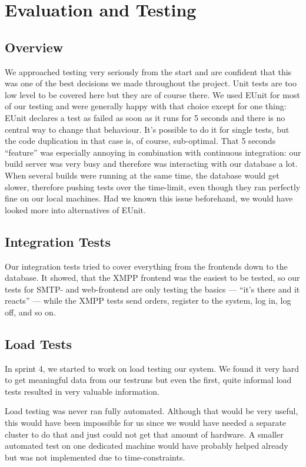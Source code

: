 \documentclass[11pt,a4paper]{report}
\newcommand{\hi}[1]{{\color{red}\em #1\/}\\}
\begin{document}
\chapter{Evaluation and Testing}
\section{Overview}
We approached testing very seriously from the start and are confident that this
was one of the best decisions we made throughout the project. Unit tests are too
low level to be covered here but they are of course there. We used EUnit for
most of our testing and were generally happy with that choice except for one
thing: EUnit declares a test as failed as soon as it runs for 5 seconds and
there is no central way to change that behaviour. It's possible to do it for
single tests, but the code duplication in that case is, of course, sub-optimal.
That 5 seconds ``feature'' was especially annoying in combination with
continuous integration: our build server was very busy and therefore was
interacting with our database a lot. When several builds were running at the
same time, the database would get slower, therefore pushing tests over the
time-limit, even though they ran perfectly fine on our local machines. Had we
known this issue beforehand, we would have looked more into alternatives of
EUnit.

\section{Integration Tests}
Our integration tests tried to cover everything from the frontends down to the
database. It showed, that the XMPP frontend was the easiest to be tested, so
our tests for SMTP- and web-frontend are only testing the basics --- ``it's
there and it reacts'' --- while the XMPP tests send orders, register to the
system, log in, log off, and so on.

\section{Load Tests}\label{load_tests}
In sprint 4, we started to work on load testing our system. We found it very
hard to get meaningful data from our testruns but even the first, quite informal
load tests resulted in very valuable information.

Load testing was never ran fully automated. Although that would be very useful,
this would have been impossible for us since we would have needed a separate
cluster to do that and just could not get that amount of hardware.
A smaller automated test on one dedicated machine would have probably helped
already but was not implemented due to time-constraints.
\end{document}

